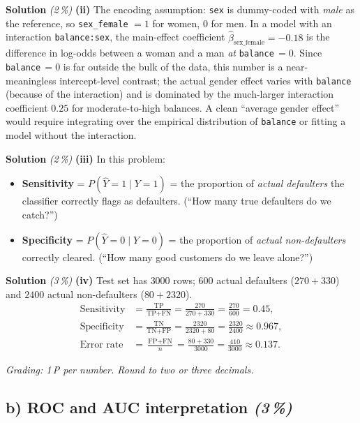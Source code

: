 \documentclass[11pt,a4paper]{article}
\newcommand{\subpoints}[1]{\textit{(#1\,\%)}}
\newcommand{\sol}{\noindent\textbf{Solution}}
\begin{document}
\medskip
\sol{} \subpoints{2} \textbf{(ii)} The encoding assumption: \texttt{sex} is dummy-coded with
\emph{male} as the reference, so \texttt{sex\_female} $=1$ for women, $0$ for men. In a model with
an interaction \texttt{balance:sex}, the main-effect coefficient $\hat\beta_{\text{sex\_female}}=-0.18$
is the difference in log-odds between a woman and a man \emph{at} \texttt{balance}\,$=0$.
Since \texttt{balance}\,$=0$ is far outside the bulk of the data, this number is a
near-meaningless intercept-level contrast; the actual gender effect varies with \texttt{balance}
(because of the interaction) and is dominated by the much-larger interaction coefficient $0.25$
for moderate-to-high balances. A clean ``average gender effect'' would require integrating over
the empirical distribution of \texttt{balance} or fitting a model without the interaction.

\medskip
\sol{} \subpoints{2} \textbf{(iii)} In this problem:
\begin{itemize}
  \item \textbf{Sensitivity} = $P(\hat Y=1\mid Y=1)$ = the proportion of \emph{actual defaulters}
        the classifier correctly flags as defaulters. (``How many true defaulters do we catch?'')
  \item \textbf{Specificity} = $P(\hat Y=0\mid Y=0)$ = the proportion of \emph{actual non-defaulters}
        correctly cleared. (``How many good customers do we leave alone?'')
\end{itemize}

\medskip
\sol{} \subpoints{3} \textbf{(iv)} Test set has $3000$ rows; $600$ actual defaulters ($270+330$)
and $2400$ actual non-defaulters ($80+2320$).
\begin{align*}
\text{Sensitivity} &= \frac{\text{TP}}{\text{TP}+\text{FN}}
   = \frac{270}{270+330} = \frac{270}{600} = \boxed{0.45}, \\
\text{Specificity} &= \frac{\text{TN}}{\text{TN}+\text{FP}}
   = \frac{2320}{2320+80} = \frac{2320}{2400} \approx \boxed{0.967}, \\
\text{Error rate} &= \frac{\text{FP}+\text{FN}}{n}
   = \frac{80+330}{3000} = \frac{410}{3000} \approx \boxed{0.137}.
\end{align*}

\noindent\emph{Grading: 1\,P per number. Round to two or three decimals.}

\subsection*{b) ROC and AUC interpretation \subpoints{3}}
\end{document}
